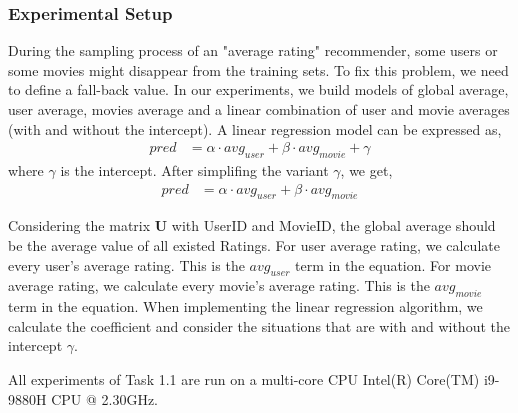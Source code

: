 \documentclass[12pt]{article}
\begin{document}
\subsubsection{Experimental Setup}
During the sampling process of an "average rating" recommender, some users or some movies might disappear from the training sets. To fix this problem, we need to define a fall-back value. In our experiments, we build models of global average, user average, movies average and a linear combination of user and movie averages (with and without the intercept). A linear regression model can be expressed as,
\begin{align*}
    pred&=\alpha\cdot avg_{user} + \beta\cdot avg_{movie} + \gamma
\end{align*}
where $\gamma$ is the intercept. After simplifing the variant $\gamma$, we get,
\begin{align*}
    pred&=\alpha\cdot avg_{user} + \beta\cdot avg_{movie}
\end{align*}
\par
Considering the matrix $\mathbf{U}$ with UserID and MovieID, the global average should be the average value of all existed Ratings. For user average rating, we calculate every user's average rating. This is the $avg_{user}$ term in the equation. For movie average rating, we calculate every movie's average rating. This is the $avg_{movie}$ term in the equation. When implementing the linear regression algorithm, we calculate the coefficient and consider the situations that are with and without the intercept $\gamma$.\par
All experiments of Task 1.1 are run on a multi-core CPU Intel(R) Core(TM) i9-9880H CPU @ 2.30GHz.
\end{document}
